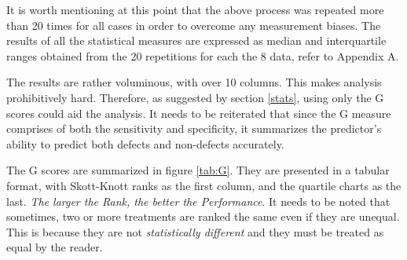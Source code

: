 \documentclass[12pt]{IEEEtran}
\begin{document}
\noindent It is worth mentioning at this point that the above process was repeated more than 20 times for all cases in order to overcome any measurement biases. The results of all the statistical measures are expressed as median and interquartile ranges obtained from the 20 repetitions for each the 8 data, refer to Appendix A.

The results are rather voluminous, with over 10 columns. This makes analysis prohibitively hard. Therefore, as suggested by section \ref{stats}, using only the G scores could aid the analysis. It needs to be reiterated that since the G measure comprises of both the sensitivity and specificity, it summarizes the predictor's ability to predict both defects and non-defects accurately. 

The G scores are summarized in figure \ref{tab:G}. They are presented in a tabular format, with Skott-Knott ranks as the first column, and the quartile charts as the last. \textit{The larger the Rank, the better the Performance}. It needs to be noted that sometimes, two or more treatments are ranked the same even if they are unequal. This is because they are not \textit{statistically different} and they must be treated as equal by the reader.
\end{document}
